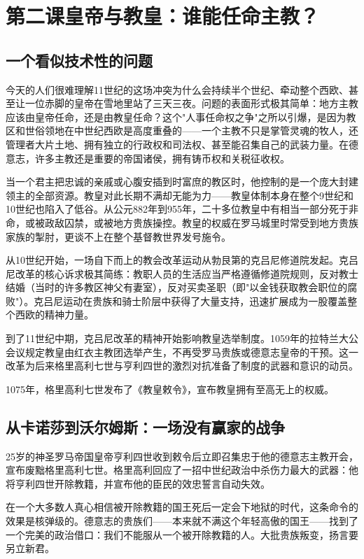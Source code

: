 \documentclass[a4paper,12pt]{ctexart}
\begin{document}
\newpage
\section{第二课\quad 皇帝与教皇：谁能任命主教？}

\subsection{一个看似技术性的问题}

今天的人们很难理解11世纪的这场冲突为什么会持续半个世纪、牵动整个西欧、甚至让一位赤脚的皇帝在雪地里站了三天三夜。问题的表面形式极其简单：地方主教应该由皇帝任命，还是由教皇任命？这个"人事任命权之争"之所以引爆，是因为教区和世俗领地在中世纪西欧是高度重叠的——一个主教不只是掌管灵魂的牧人，还管理者大片土地、拥有独立的行政权和司法权、甚至能召集自己的武装力量。在德意志，许多主教还是重要的帝国诸侯，拥有铸币权和关税征收权。

当一个君主把忠诚的亲戚或心腹安插到时富庶的教区时，他控制的是一个庞大封建领主的全部资源。教皇对此长期不满却无能为力——教皇体制本身在整个9世纪和10世纪也陷入了低谷。从公元882年到955年，二十多位教皇中有相当一部分死于非命，或被政敌囚禁，或被地方贵族操控。教皇的权威在罗马城里时常受到地方贵族家族的掣肘，更谈不上在整个基督教世界发号施令。

从10世纪开始，一场自下而上的教会改革运动从勃艮第的克吕尼修道院发起。克吕尼改革的核心诉求极其简练：教职人员的生活应当严格遵循修道院规则，反对教士结婚（当时的许多教区神父有妻室），反对买卖圣职（即"以金钱获取教会职位的腐败"）。克吕尼运动在贵族和骑士阶层中获得了大量支持，迅速扩展成为一股覆盖整个西欧的精神力量。

到了11世纪中期，克吕尼改革的精神开始影响教皇选举制度。1059年的拉特兰大公会议规定教皇由红衣主教团选举产生，不再受罗马贵族或德意志皇帝的干预。这一改革为后来格里高利七世与亨利四世的激烈对抗准备了制度的武器和意识的动员。

1075年，格里高利七世发布了《教皇敕令》，宣布教皇拥有至高无上的权威。

\subsection{从卡诺莎到沃尔姆斯：一场没有赢家的战争}

25岁的神圣罗马帝国皇帝亨利四世收到敕令后立即召集忠于他的德意志主教开会，宣布废黜格里高利七世。格里高利回应了一招中世纪政治中杀伤力最大的武器：他将亨利四世开除教籍，并宣布他的臣民的效忠誓言自动失效。

在一个大多数人真心相信被开除教籍的国王死后一定会下地狱的时代，这条命令的效果是核弹级的。德意志的贵族们——本来就不满这个年轻高傲的国王——找到了一个完美的政治借口：我们不能服从一个被开除教籍的人。大批贵族叛变，扬言要另立新君。
\end{document}
